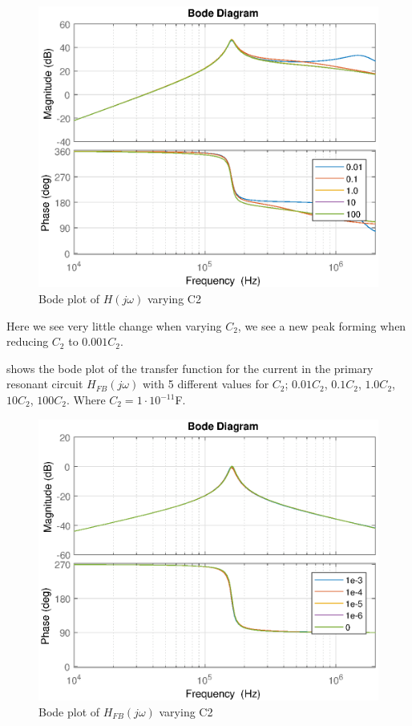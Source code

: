 \begin{figure}[H]
    \centering
    \includegraphics[width=\textwidth]{img/CoilRigBode_C2.eps}
    \caption{Bode plot of $H(j\omega)$ varying C2}
    \label{fig:bode_c2}
\end{figure}

Here we see very little change when varying $C_2$, we see a new peak forming when reducing $C_2$ to $0.001 C_2$.

 shows the bode plot of the transfer function for the current in the primary resonant circuit $H_{FB}(j\omega)$ with 5 different values for $C_2$; $0.01C_2$, $0.1C_2$, $1.0C_2$, $10C_2$, $100C_2$. Where $C_2 = 1 \cdot 10^{-11}$F.
\begin{figure}[H]
    \centering
    \includegraphics[width=\textwidth]{img/FeedBackBode_C2.eps}
    \caption{Bode plot of $H_{FB}(j\omega)$ varying C2}
    \label{fig:fbbode_c2}
\end{figure}

